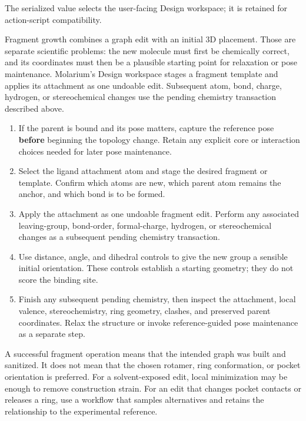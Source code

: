 The serialized value  selects the user-facing Design workspace; it is retained for action-script compatibility.


Fragment growth combines a graph edit with an initial 3D placement. Those are separate scientific problems: the new molecule must first be chemically correct, and its coordinates must then be a plausible starting point for relaxation or pose maintenance. Molarium's Design workspace stages a fragment template and applies its attachment as one undoable edit. Subsequent atom, bond, charge, hydrogen, or stereochemical changes use the pending chemistry transaction described above.


\begin{enumerate}
\item If the parent is bound and its pose matters, capture the reference pose \textbf{before} beginning the topology change. Retain any explicit core or interaction choices needed for later pose maintenance.
\item Select the ligand attachment atom and stage the desired fragment or template. Confirm which atoms are new, which parent atom remains the anchor, and which bond is to be formed.
\item Apply the attachment as one undoable fragment edit. Perform any associated leaving-group, bond-order, formal-charge, hydrogen, or stereochemical changes as a subsequent pending chemistry transaction.
\item Use distance, angle, and dihedral controls to give the new group a sensible initial orientation. These controls establish a starting geometry; they do not score the binding site.
\item Finish any subsequent pending chemistry, then inspect the attachment, local valence, stereochemistry, ring geometry, clashes, and preserved parent coordinates. Relax the structure or invoke reference-guided pose maintenance as a separate step.
\end{enumerate}


A successful fragment operation means that the intended graph was built and sanitized. It does not mean that the chosen rotamer, ring conformation, or pocket orientation is preferred. For a solvent-exposed edit, local minimization may be enough to remove construction strain. For an edit that changes pocket contacts or releases a ring, use a workflow that samples alternatives and retains the relationship to the experimental reference.

